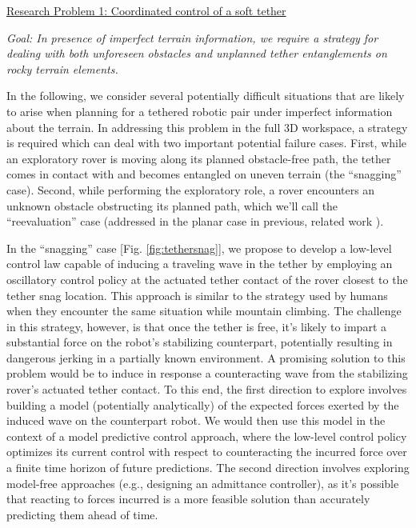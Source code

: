 \documentclass[12pt]{article}
\begin{document}
\noindent\underline{Research Problem 1: Coordinated control of a soft tether}

{\sl Goal: In presence of imperfect terrain information, we require a
  strategy for dealing with both unforeseen obstacles and unplanned
  tether entanglements on rocky terrain elements. }


In the following, we consider several potentially difficult situations
that are likely to arise when planning for a tethered robotic pair
under imperfect information about the terrain. In addressing this
problem in the full 3D workspace, a strategy is required which can
deal with two important potential failure cases. First, while an
exploratory rover is moving along its planned obstacle-free path, the
tether comes in contact with and becomes entangled on uneven terrain
(the ``snagging'' case). Second, while performing the exploratory
role, a rover encounters an unknown obstacle obstructing its planned
path, which we'll call the ``reevaluation'' case (addressed in the
planar case in previous, related work \cite{axel_online}).


In the ``snagging'' case [Fig. \ref{fig:tethersnag}], we propose to
develop a low-level control law capable of inducing a traveling wave
in the tether by employing an oscillatory control policy at the
actuated tether contact of the rover closest to the tether snag
location. This approach is similar to the strategy used by humans when
they encounter the same situation while mountain climbing.  The
challenge in this strategy, however, is that once the tether is free,
it's likely to impart a substantial force on the robot's stabilizing
counterpart, potentially resulting in dangerous jerking in a partially
known environment.  A promising solution to this problem would be to
induce in response a counteracting wave from the stabilizing rover's
actuated tether contact. To this end, the first direction to explore
involves building a model (potentially analytically) of the expected
forces exerted by the induced wave on the counterpart robot.  We would
then use this model in the context of a model predictive control
approach, where the low-level control policy optimizes its current
control with respect to counteracting the incurred force over a finite
time horizon of future predictions. The second direction involves
exploring model-free approaches (e.g., designing an admittance
controller), as it's possible that reacting to forces incurred is a
more feasible solution than accurately predicting them ahead of time.
\end{document}

